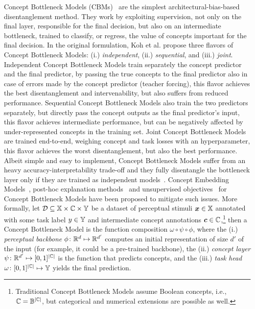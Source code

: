 Concept Bottleneck Models (CBMs)~\cite{koh2020concept} are the simplest architectural-bias-based disentanglement method. They work by exploiting supervision, not only on the final layer, responsible for the final decision, but also on an intermediate bottleneck, trained to classify, or regress, the value of concepts important for the final decision. 
In the original formulation, Koh et al. propose three flavors of Concept Bottleneck Models: (i.) \textit{independent}, (ii.) \textit{sequential}, and (iii.) \textit{joint}. 
Independent Concept Bottleneck Models train separately the concept predictor and the final predictor, by passing the true concepts to the final predictor also in case of errors made by the concept predictor (teacher forcing), this flavor achieves the best disentanglement and intervenability, but also suffers from reduced performance.
Sequential Concept Bottleneck Models also train the two predictors separately, but directly pass the concept outputs as the final predictor's input, this flavor achieves intermediate performance, but can be negatively affected by under-represented concepts in the training set.
Joint Concept Bottleneck Models are trained end-to-end, weighing concept and task losses with an hyperparameter, this flavor achieves the worst disentanglement, but also the best performance. 
%
Albeit simple and easy to implement, Concept Bottleneck Models suffer from an heavy accuracy-interpretability trade-off and they fully disentangle the bottleneck layer only if they are trained as independent models~\cite{margeloiu2021concept}.
Concept Embedding Models~\cite{espinosa2022concept}, post-hoc explanation methods~\cite{yuksekgonul2022post} and unsupervised objectives~\cite{sawada2022concept} for Concept Bottleneck Models have been proposed to mitigate such issues.
%
More formally, let ${\mathcal{D}} \subseteq {\mathbb{X}} \times {\mathbb{C}} \times {\mathbb{Y}}$ be a dataset of perceptual stimuli ${\bm{x}} \in {\mathbb{X}}$ annotated with some task label $y \in {\mathbb{Y}}$ and intermediate concept annotations ${\bm{c}} \in {\mathbb{C}}$,\footnote{Traditional Concept Bottleneck Models assume Boolean concepts, i.e., ${\mathbb{C}} = {\mathbb{B}}^{|{\mathbb{C}}|}$, but categorical and numerical extensions are possible as well.} then a Concept Bottleneck Model is the function composition $\omega \circ \psi \circ \phi$, where the (i.) \textit{perceptual backbone} $\phi \colon \mathbb{R}^{d} \mapsto \mathbb{R}^{d'}$ computes an initial representation of size $d'$ of the input (for example, it could be a pre-trained backbone), the (ii.) \textit{concept layer} $\psi \colon \mathbb{R}^{d'} \mapsto [0,1]^{|{\mathbb{C}}|}$ is the function that predicts concepts, and the (iii.) \textit{task head} $\omega \colon [0,1]^{|{\mathbb{C}}|} \mapsto {\mathbb{Y}}$ yields the final prediction. 
